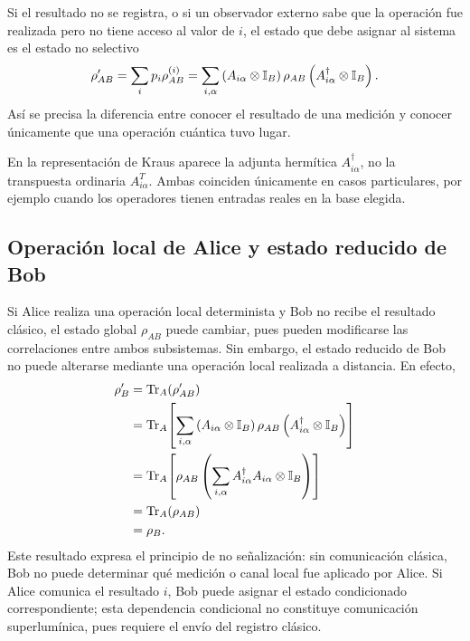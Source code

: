 \documentclass[../main.tex]{subfiles}
\begin{document}
Si el resultado no se registra, o si un observador externo sabe que la operación fue realizada pero no tiene acceso al valor de $i$, el estado que debe asignar al sistema es el estado no selectivo
\begin{equation*}
    \rho'_{AB}
    =\sum_i p_i\rho_{AB}^{(i)}
    =\sum_{i,\alpha}
    \left(A_{i\alpha}\otimes\mathbb{I}_B\right)
    \rho_{AB}
    \left(A_{i\alpha}^{\dagger}\otimes\mathbb{I}_B\right).
\end{equation*}
Así se precisa la diferencia entre conocer el resultado de una medición y conocer únicamente que una operación cuántica tuvo lugar.

\begin{observacion}
En la representación de Kraus aparece la adjunta hermítica $A_{i\alpha}^{\dagger}$, no la transpuesta ordinaria $A_{i\alpha}^{T}$. Ambas coinciden únicamente en casos particulares, por ejemplo cuando los operadores tienen entradas reales en la base elegida.
\end{observacion}

\subsection*{Operación local de Alice y estado reducido de Bob}

Si Alice realiza una operación local determinista y Bob no recibe el resultado clásico, el estado global $\rho_{AB}$ puede cambiar, pues pueden modificarse las correlaciones entre ambos subsistemas. Sin embargo, el estado reducido de Bob no puede alterarse mediante una operación local realizada a distancia. En efecto,
\begin{align*}
    \rho'_B
    &=\Tr_A\!\left(\rho'_{AB}\right) \\
    &=\Tr_A\!\left[
        \sum_{i,\alpha}
        \left(A_{i\alpha}\otimes\mathbb{I}_B\right)
        \rho_{AB}
        \left(A_{i\alpha}^{\dagger}\otimes\mathbb{I}_B\right)
      \right] \\
    &=\Tr_A\!\left[
        \rho_{AB}
        \left(
            \sum_{i,\alpha}A_{i\alpha}^{\dagger}A_{i\alpha}
            \otimes\mathbb{I}_B
        \right)
      \right] \\
    &=\Tr_A(\rho_{AB}) \\
    &=\rho_B.
\end{align*}
Este resultado expresa el principio de no señalización: sin comunicación clásica, Bob no puede determinar qué medición o canal local fue aplicado por Alice. Si Alice comunica el resultado $i$, Bob puede asignar el estado condicionado correspondiente; esta dependencia condicional no constituye comunicación superlumínica, pues requiere el envío del registro clásico.
\end{document}
